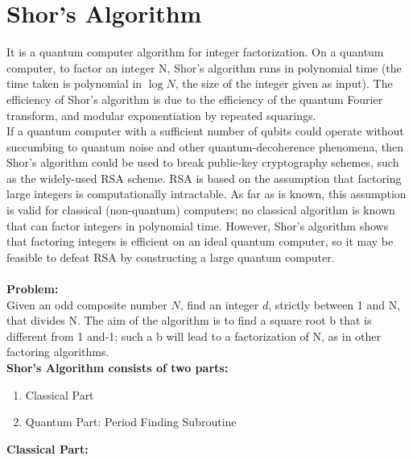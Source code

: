 \documentclass[12pt]{report}
\begin{document}
\section{Shor's Algorithm}
It is a quantum computer algorithm for integer factorization. On a quantum computer, to factor an integer N, Shor's algorithm runs in polynomial time (the time taken is polynomial in  $\log N$, the size of the integer given as input). The efficiency of Shor's algorithm is due to the efficiency of the quantum Fourier transform, and modular exponentiation by repeated squarings. \\
If a quantum computer with a sufficient number of qubits could operate without succumbing to quantum noise and other quantum-decoherence phenomena, then Shor's algorithm could be used to break public-key cryptography schemes, such as the widely-used RSA scheme. RSA is based on the assumption that factoring large integers is computationally intractable. As far as is known, this assumption is valid for classical (non-quantum) computers; no classical algorithm is known that can factor integers in polynomial time. However, Shor's algorithm shows that factoring integers is efficient on an ideal quantum computer, so it may be feasible to defeat RSA by constructing a large quantum computer.\\
\\
\textbf{Problem: }\\
Given an odd composite number $N$, find an integer $d$, strictly between 1 and N, that divides N. The aim of the algorithm is to find a square root b that is different from  1 and-1; such a b will lead to a factorization of N, as in other factoring algorithms.
\\
\textbf{Shor's Algorithm consists of two parts:}
\begin{enumerate}
\item Classical Part
\item Quantum Part: Period Finding Subroutine
\end{enumerate}
\textbf{Classical Part:}
\end{document}
